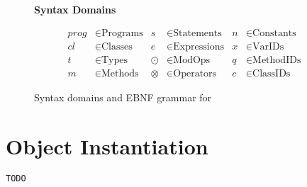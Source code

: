 \begin{figure}[h]
\vspace{2mm}
\textbf{Syntax Domains}

\begin{align*}
    prog &\in \text{Programs} & s &\in \text{Statements}      & n &\in \text{Constants} \\
    cl   &\in \text{Classes}  & e &\in \text{Expressions}     & x &\in \text{VarIDs}    \\
    t    &\in \text{Types}    & \odot &\in \text{ModOps}      & q &\in \text{MethodIDs} \\
    m    &\in \text{Methods}  & \otimes &\in \text{Operators} & c &\in \text{ClassIDs}
\end{align*}

\caption{Syntax domains and EBNF grammar for \rooplpp}
\label{fig:roopl-grammar}
\end{figure}

\newpage
\section{Object Instantiation}
\texttt{TODO}
